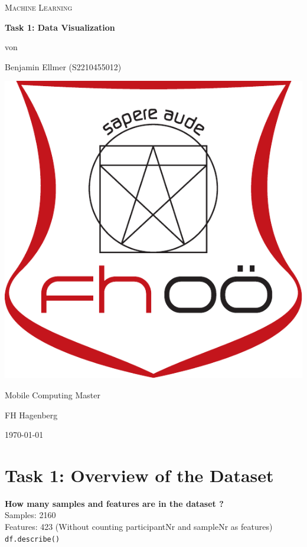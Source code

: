 \documentclass[14pt,a4paper]{extarticle}
\begin{document}
	\begin{titlepage}
		\centering
		{\scshape\LARGE Machine Learning \par}
		\vspace{2.5cm}
		{\huge\bfseries Task 1: Data Visualization}
		\vfill
		{\normalsize von\par}
		{\normalsize Benjamin Ellmer (\textsc{S2210455012}) \par}
		\vspace{1cm}
		\includegraphics[width=0.3\textheight]{images/logo.pdf} \par
		\vspace{1cm}
		{\large Mobile Computing Master \par}
		{\large FH Hagenberg \par}
		\vfill
		{\large \today\par}
	\end{titlepage}


    \section*{Task 1: Overview of the Dataset}

    \noindent \textbf{How many samples and features are in the dataset ?}\\
    Samples: 2160 \\
    Features: 423 (Without counting participantNr and sampleNr as features) \\
    \lstinline|df.describe()| \\
\end{document}
